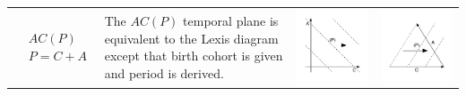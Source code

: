 \documentclass[11pt,oneside,a4paper]{article} %
\begin{document}
\begin{center}
\begin{longtable}{m{}m{}m{}m{}}
  \midrule
  $$\begin{aligned}
    &AC(P) \\
    &P = C + A
  \end{aligned}$$ &
  The $AC(P)$ temporal plane is equivalent to the Lexis diagram except that
  birth cohort is given and period is derived. &
  \includegraphics[width = \linewidth]{Figures/JonasTable/ACp.pdf} & \includegraphics[width = \linewidth]{Figures/JonasTable/ACp_iso.pdf}  \\

\end{longtable}
\end{center}
\end{document}
